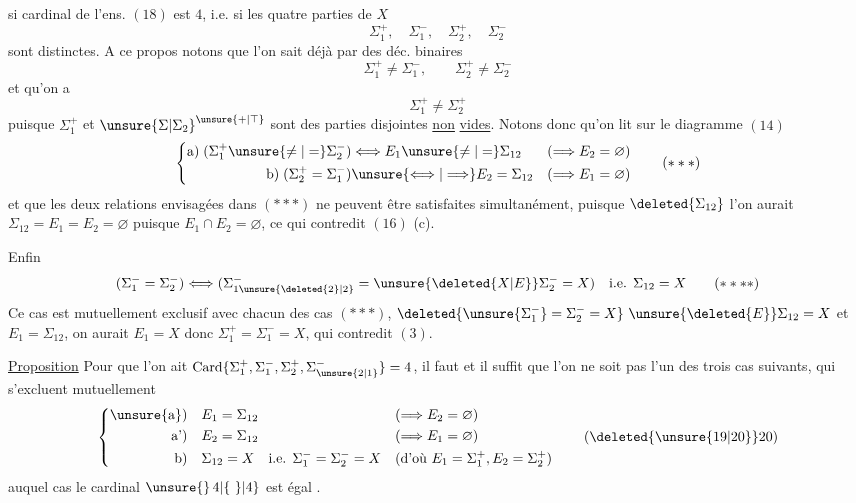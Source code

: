 \begingroup\makeatletter\tagsleft@true\makeatother
si  cardinal de l'ens. $(18)$ est $4$, i.e. si les quatre parties de $X$
\[
\Sigma_1^+,\quad\Sigma_1^-,\quad\Sigma_2^+,\quad\Sigma_2^-
\]
sont distinctes. A ce propos notons que l'on sait déjà par   des déc. binaires
\[
\Sigma_1^+\ne\Sigma_1^-,\qquad\Sigma_2^+\ne\Sigma_2^-
\tag*{($*$)}
\]
et qu'on a
\[
\Sigma_1^+\ne\Sigma_2^+
\tag*{($**$)}
\]
puisque $\Sigma_1^+$ et $\unsure{\Sigma|\Sigma_2}^{\unsure{+|\top}}$ sont des parties disjointes \uline{non} \uline{vides}. Notons donc qu'on lit sur le diagramme $(14)$
\[
\left\{\begin{aligned}
\text{a)}\;(\Sigma_1^+\unsure{\ne|=}\Sigma_2^-)&\Longleftrightarrow E_1\unsure{\ne|=}\Sigma_{12}
   &(\Longrightarrow E_2=\varnothing)\\
\text{b)}\;(\Sigma_2^+=\Sigma_1^-)&\unsure{\Longleftrightarrow|\Longrightarrow} E_2=\Sigma_{12}
   &(\Longrightarrow E_1=\varnothing)
\end{aligned}\right.
\tag*{($***$)}
\]
et que les deux relations  envisagées dans $(***)$ ne peuvent être satisfaites simultanément, puisque $\deleted{\Sigma_{12}}$ l'on aurait $\Sigma_{12}=E_1=E_2=\varnothing$ puisque $E_1\cap E_2=\varnothing$, ce qui contredit $(16)$ (c).

Enfin
\[
(\Sigma_1^-=\Sigma_2^-)\Longleftrightarrow
(\Sigma_{1\unsure{\deleted{2}|2}}^-=\unsure{\deleted{X|E}}\Sigma_2^-=X)
\quad\text{i.e. }\Sigma_{12}=X
\tag*{($****$)}
\]
Ce cas est mutuellement exclusif avec chacun des cas $(***)$,   $\deleted{\unsure{\Sigma_1^-}=\Sigma_2^-=X}\ \unsure{\deleted{E}}\Sigma_{12}=X$ et $E_1=\Sigma_{12}$, on aurait $E_1=X$ donc $\Sigma_1^+=\Sigma_1^-=X$,  qui contredit $(3)$.

\uline{Proposition} Pour que l'on ait $\operatorname{Card}\{\Sigma_1^+,\Sigma_1^-,\Sigma_2^+,\Sigma_{\unsure{2|1}}^-\}=4$, il faut et il suffit que l'on ne soit pas l'un des trois cas suivants, qui s'excluent mutuellement
\[
\left\{\begin{aligned}
\text{\unsure{a})}\quad &E_1=\Sigma_{12}&&(\Longrightarrow E_2=\varnothing)\\
\text{a')}\quad &E_2=\Sigma_{12}&&(\Longrightarrow E_1=\varnothing)\\
\text{b)}\quad &\Sigma_{12}=X\quad\text{i.e. }\Sigma_1^-=\Sigma_2^-=X
   &&(\text{d'où }E_1=\Sigma_1^+,E_2=\Sigma_2^+)
\end{aligned}\right.
\tag*{(\deleted{\unsure{19|20}}20)}
\]
auquel cas le cardinal  $\unsure{\}\,4|\{\ \}|4}$ est égal  .

\endgroup
\clearpage

